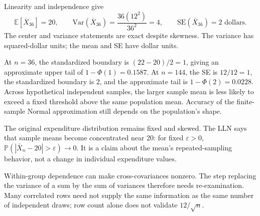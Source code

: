 \documentclass[11pt]{article}
\begin{document}
\begin{parts}
\item Linearity and independence give
\[
\mathbb E[\bar X_{36}]=20,\qquad
\mathrm{Var}(\bar X_{36})=\frac{36(12^2)}{36^2}=4,\qquad
\mathrm{SE}(\bar X_{36})=2\text{ dollars}.
\]
The center and variance statements are exact despite skewness. The variance has squared-dollar units; the mean and SE have dollar units.
\item At $n=36$, the standardized boundary is $(22-20)/2=1$, giving an approximate upper tail of $1-\Phi(1)=0.1587$. At $n=144$, the SE is $12/12=1$, the standardized boundary is 2, and the approximate tail is $1-\Phi(2)=0.0228$. Across hypothetical independent samples, the larger sample mean is less likely to exceed a fixed threshold above the same population mean. Accuracy of the finite-sample Normal approximation still depends on the population's shape.
\item The original expenditure distribution remains fixed and skewed. The LLN says that sample means become concentrated near 20: for fixed $\varepsilon>0$, $\mathbb P(|\bar X_n-20|>\varepsilon)\to0$. It is a claim about the mean's repeated-sampling behavior, not a change in individual expenditure values.
\item Within-group dependence can make cross-covariances nonzero. The step replacing the variance of a sum by the sum of variances therefore needs re-examination. Many correlated rows need not supply the same information as the same number of independent draws; row count alone does not validate $12/\sqrt n$.
\end{parts}
\end{document}
